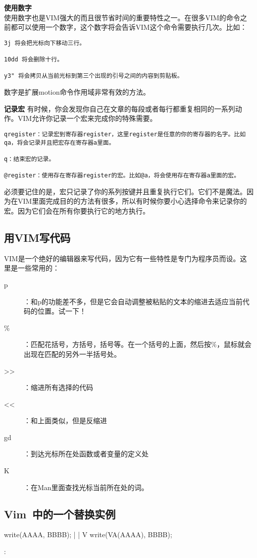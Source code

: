 \textbf{使用数字}\\
使用数字也是VIM强大的而且很节省时间的重要特性之一。在很多VIM的命令之前都可以使用一个数字，这个数字将会告诉VIM这个命令需要执行几次。比如：
\begin{verbatim}
3j 将会把光标向下移动三行。

10dd 将会删除十行。

y3" 将会拷贝从当前光标到第三个出现的引号之间的内容到剪贴板。
\end{verbatim}
数字是扩展motion命令作用域非常有效的方法。

\textbf{记录宏} 
有时候，你会发现你自己在文章的每段或者每行都重复相同的一系列动作。VIM允许你记录一个宏来完成你的特殊需要。
\begin{verbatim}
qregister：记录宏到寄存器register，这里register是任意的你的寄存器的名字。比如qa，将会记录并且把宏存在寄存器a里面。

q：结束宏的记录。

@register：使用存在寄存器register的宏。比如@a，将会使用存在寄存器a里面的宏。
\end{verbatim}
必须要记住的是，宏只记录了你的系列按键并且重复执行它们。它们不是魔法。因为在VIM里面完成目的的方法有很多，所以有时候你要小心选择命令来记录你的宏。因为它们会在所有你要执行它的地方执行。

\subsection{用VIM写代码}
VIM是一个绝好的编辑器来写代码，因为它有一些特性是专门为程序员而设。这里是一些常用的：
\begin{description}
	\item[p]：和p的功能差不多，但是它会自动调整被粘贴的文本的缩进去适应当前代码的位置。试一下！
	\item[\%]：匹配花括号，方括号，括号等。在一个括号的上面，然后按\%，鼠标就会出现在匹配的另外一半括号处。
	\item[\textgreater\textgreater]：缩进所有选择的代码
	\item[\textless\textless]：和上面类似，但是反缩进
	\item[gd]：到达光标所在处函数或者变量的定义处
	\item[K]：在Man里面查找光标当前所在处的词。
\end{description}

\subsection{Vim~中的一个替换实例}
\begin{code}
write(AAAA, BBBB);
	|
	|
	V
write(VA(AAAA), BBBB);

:%
\end{code}

